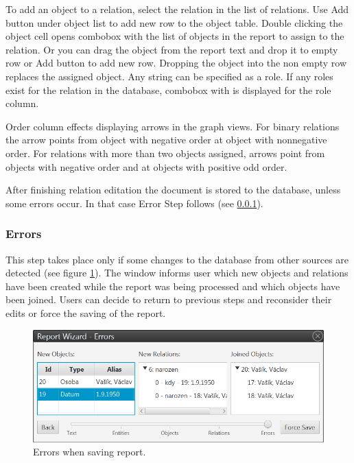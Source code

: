 \documentclass[12pt,a4paper]{report}
\begin{document}
To add an object to a relation, select the relation in the list of relations.
Use Add button under object list to add new row to the object table. Double
clicking the object cell opens combobox with the list of objects in the report
to assign to the relation. Or you can drag the object from the report text and
drop it to empty row or Add button to add new row. Dropping the object into the
non empty row replaces the assigned object. Any string can be specified as
a role. If any roles exist for the relation in the database, combobox with
is displayed for the role column.

Order column effects displaying arrows in the graph views. For binary
relations the arrow points from object with negative order at object with
nonnegative order. For relations with more than two objects assigned, arrows
point from objects with negative order and at objects with positive odd order.

After finishing relation editation the document is stored to the database,
unless some errors occur. In that case Error Step follows (see
\ref{sssec:Errors}).

\subsubsection{Errors}
\label{sssec:Errors}

This step takes place only if some changes to the database from other sources
are detected (see figure \ref{fig:Errors}). The window informs user which new
objects and relations have been created while the report was being processed and
which objects have been joined. Users can decide to return to previous steps
and reconsider their edits or force the saving of the report.

\begin{figure}[!htb]
        \centering
        \includegraphics[width=\textwidth]{Images/errors}
        \caption{Errors when saving report.}
        \label{fig:Errors}
\end{figure}
\end{document}
